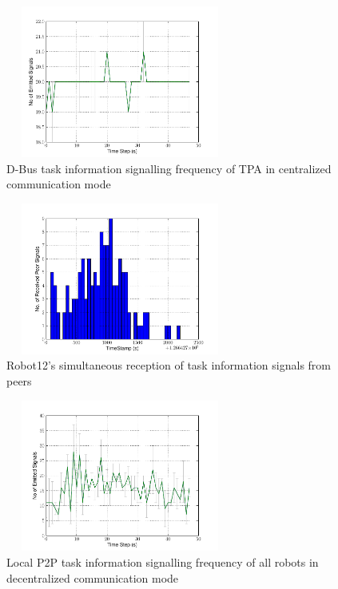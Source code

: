 \documentclass{ifacconf}
\begin{document}
\begin{figure}
\begin{center}
\includegraphics[width=7.5cm,height=5cm]{./images/Global-SignalingFreqStat}    %
\caption{D-Bus task information signalling frequency of TPA in centralized communication mode} 
\label{fig:global-freq}
\end{center}
\end{figure}
\begin{figure}
\begin{center}
\includegraphics[width=7.5cm,height=5cm]{./images/Robot12-17feb-3-LocalSignals}
\caption{Robot12's simultaneous reception of task information signals from peers} 
\label{fig:robot-freq}
\end{center}
\end{figure}
\begin{figure}
\begin{center}
\includegraphics[width=7.5cm,height=5cm]{./images/Local-500cm-SignalingFreqStat}    %
\caption{Local P2P task information signalling frequency of all robots in decentralized communication mode} 
\label{fig:global-freq}
\end{center}
\end{figure}
\end{document}
